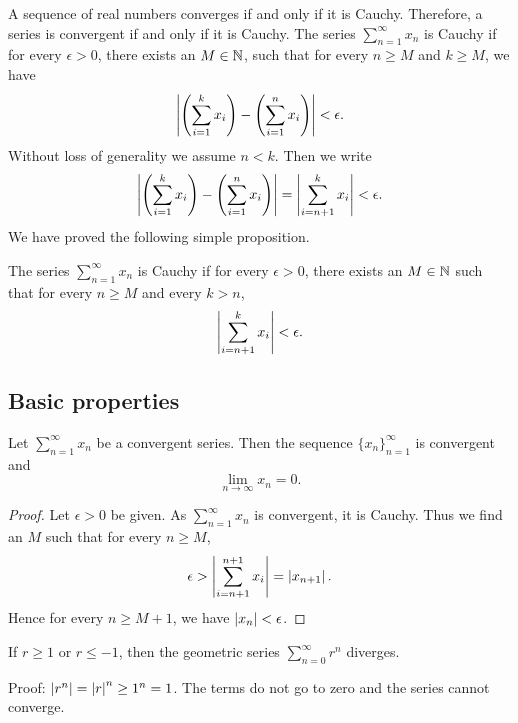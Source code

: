 A sequence of real numbers converges if and only if it is
Cauchy.  Therefore, a series is convergent if and only if it is Cauchy.
The series $\sum_{n=1}^\infty x_n$ is Cauchy if for every $\epsilon > 0$,
there exists an $M \in {\mathbb{N}}$, such that for every $n \geq M$
and $k \geq M$, we have
\begin{equation*}
\left\lvert { \left( \sum_{i=1}^k x_i \right) - \left( \sum_{i=1}^n x_i \right) } \right\rvert
< \epsilon .
\end{equation*}
Without loss of generality we assume $n < k$.  Then we write
\begin{equation*}
\left\lvert { \left( \sum_{i=1}^k x_i \right) - \left( \sum_{i=1}^n x_i \right) } \right\rvert
=
\left\lvert { \sum_{i={n+1}}^k x_i } \right\rvert
< \epsilon .
\end{equation*}
We have proved the following simple proposition.

\begin{prop} \label{prop:cachyser}
The series $\sum_{n=1}^\infty x_n$ is Cauchy if for every $\epsilon > 0$, 
there exists an $M \in {\mathbb{N}}$ such that for every $n \geq M$
and every $k > n$,
\begin{equation*}
\left\lvert { \sum_{i={n+1}}^k x_i } \right\rvert
< \epsilon .
\end{equation*}
\end{prop}

\subsection{Basic properties}

\begin{prop}
Let $\sum_{n=1}^\infty x_n$ be a convergent series.  Then
the sequence $\{ x_n \}_{n=1}^\infty$ is convergent and
\begin{equation*}
\lim_{n\to\infty} x_n = 0.
\end{equation*}
\end{prop}

\begin{proof}
Let $\epsilon > 0$ be given.  As $\sum_{n=1}^\infty x_n$ is convergent, it is Cauchy.
Thus we find an $M$ such that for every $n \geq M$,
\begin{equation*}
\epsilon > 
\left\lvert { \sum_{i={n+1}}^{n+1} x_i } \right\rvert
=
\left\lvert { x_{n+1} } \right\rvert .
\end{equation*}
Hence for every $n \geq M+1$, we have $\left\lvert {x_{n}} \right\rvert < \epsilon$.
\end{proof}

\begin{example}
If $r \geq 1$ or $r \leq -1$, then the geometric series $\sum_{n=0}^\infty r^n$
diverges.

Proof: $\left\lvert {r^n} \right\rvert = \left\lvert {r} \right\rvert^n \geq 1^n = 1$.  The terms do not go to zero
and the series cannot converge.
\end{example}

